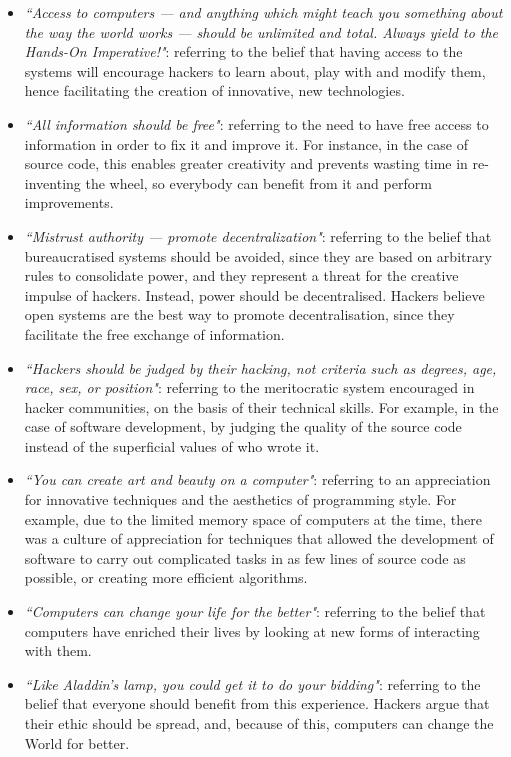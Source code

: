 \begin{itemize}
	\item \textit{``Access to computers --- and anything which might teach you something about the way the world works --- should be unlimited and total. Always yield to the Hands-On Imperative!"}: referring to the belief that having access to the systems will encourage hackers to learn about, play with and modify them, hence facilitating the creation of innovative, new technologies.
	\item \textit{``All information should be free"}: referring to the need to have free access to information in order to fix it and improve it. For instance, in the case of source code, this enables greater creativity and prevents wasting time in re-inventing the wheel, so everybody can benefit from it and perform improvements.
	\item \textit{``Mistrust authority --- promote decentralization"}: referring to the belief that bureaucratised systems should be avoided, since they are based on arbitrary rules to consolidate power, and they represent a threat for the creative impulse of hackers. Instead, power should be decentralised. Hackers believe open systems are the best way to promote decentralisation, since they facilitate the free exchange of information. 
	\item \textit{``Hackers should be judged by their hacking, not criteria such as degrees, age, race, sex, or position"}: referring to the meritocratic system encouraged in hacker communities, on the basis of their technical skills. For example, in the case of software development, by judging the quality of the source code instead of the superficial values of who wrote it.
	\item \textit{``You can create art and beauty on a computer"}: referring to an appreciation for innovative techniques and the aesthetics of programming style. For example, due to the limited memory space of computers at the time, there was a culture of appreciation for techniques that allowed the development of software to carry out complicated tasks in as few lines of source code as possible, or creating more efficient algorithms. 
	\item \textit{``Computers can change your life for the better"}: referring to the belief that computers have enriched their lives by looking at new forms of interacting with them.
	\item \textit{``Like Aladdin's lamp, you could get it to do your bidding"}: referring to the belief that everyone should benefit from this experience. Hackers argue that their ethic should be spread, and, because of this, computers can change the World for better.	
\end{itemize}


